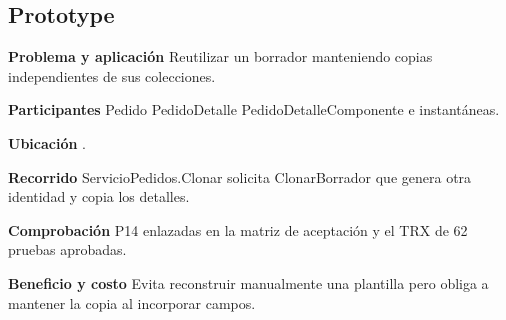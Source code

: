 \noindent\begin{minipage}{\linewidth}
\subsection{Prototype}
\textbf{Problema y aplicación} Reutilizar un borrador manteniendo copias independientes de sus colecciones.

\textbf{Participantes} Pedido PedidoDetalle PedidoDetalleComponente e instantáneas.

\textbf{Ubicación} \href{https://github.com/Alan77-bot/LogiMarket360Alan/blob/68bda51063441415524ede51bdf61649ee9b4973/LogiMarket.Domain/Pedidos/Pedido.cs#L81}{}.

\textbf{Recorrido} ServicioPedidos.Clonar solicita ClonarBorrador que genera otra identidad y copia los detalles.


\textbf{Comprobación} P14 enlazadas en la matriz de aceptación y el TRX de 62 pruebas aprobadas.

\textbf{Beneficio y costo} Evita reconstruir manualmente una plantilla pero obliga a mantener la copia al incorporar campos.

\end{minipage}\par\smallskip
